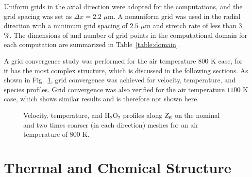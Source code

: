\documentclass[review,3p,times]{elsarticle}
\begin{document}
Uniform grids in the \textcolor{mycolor}{axial} direction were adopted for the computations, and the grid spacing was set as $\Delta x = 2.2$ $\mu$m.  A nonuniform grid was used in the radial direction with a minimum grid spacing of $2.5$ $\mu$m and stretch rate of less than $3$\%.  The dimensions of and number of grid points in the computational domain for each computation are summarized in Table~\ref{table:domain}.

\begin{table}
  \caption{Computational domain and number of grid points.}
  \label{table:domain}
  \centering
  \normalsize
\end{table}

A grid convergence study was performed for the air temperature $800$ K case, for it has the most complex structure, which is discussed in the following sections.  As shown in Fig.~\ref{fig:convergence}, grid convergence was achieved for velocity, temperature, and species profiles.  Grid convergence was also verified for the air temperature $1100$ K case, which shows similar results and is therefore not shown here.  

\begin{figure}
  \centering
  \scriptsize
  \hspace{-0.40625in}
  
  \hspace{-0.40625in}
  
  \hspace{-0.40625in}
  
  \normalsize
  \caption{Velocity, temperature, and H$_2$O$_2$ profiles along $Z_{\rm st}$ on the nominal and two times coarser (in each direction) meshes for an air temperature of $800$ K.}
  \label{fig:convergence}
\end{figure}



\section{Thermal and Chemical Structure} \label{sec:structure}
\end{document}
